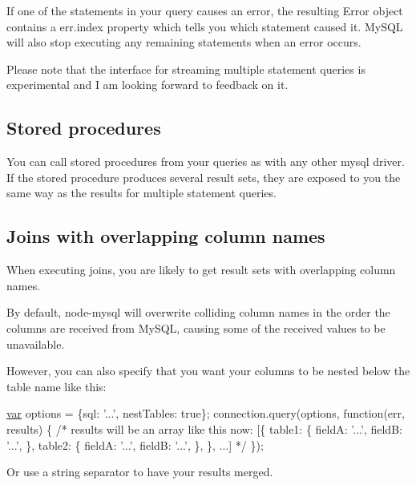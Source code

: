 If one of the statements in your query causes an error, the resulting Error object contains a {\ttfamily err.\+index} property which tells you which statement caused it. My\+S\+Q\+L will also stop executing any remaining statements when an error occurs.

Please note that the interface for streaming multiple statement queries is experimental and I am looking forward to feedback on it.

\subsection*{Stored procedures}

You can call stored procedures from your queries as with any other mysql driver. If the stored procedure produces several result sets, they are exposed to you the same way as the results for multiple statement queries.

\subsection*{Joins with overlapping column names}

When executing joins, you are likely to get result sets with overlapping column names.

By default, node-\/mysql will overwrite colliding column names in the order the columns are received from My\+S\+Q\+L, causing some of the received values to be unavailable.

However, you can also specify that you want your columns to be nested below the table name like this\+:


\begin{DoxyCode}
\hyperlink{018__def_8c_a335628f2e9085305224b4f9cc6e95ed5}{var} options = \{sql: \textcolor{stringliteral}{'...'}, nestTables: \textcolor{keyword}{true}\};
connection.query(options, \textcolor{keyword}{function}(err, results) \{
  \textcolor{comment}{/* results will be an array like this now:}
\textcolor{comment}{  [\{}
\textcolor{comment}{    table1: \{}
\textcolor{comment}{      fieldA: '...',}
\textcolor{comment}{      fieldB: '...',}
\textcolor{comment}{    \},}
\textcolor{comment}{    table2: \{}
\textcolor{comment}{      fieldA: '...',}
\textcolor{comment}{      fieldB: '...',}
\textcolor{comment}{    \},}
\textcolor{comment}{  \}, ...]}
\textcolor{comment}{  */}
\});
\end{DoxyCode}


Or use a string separator to have your results merged.


